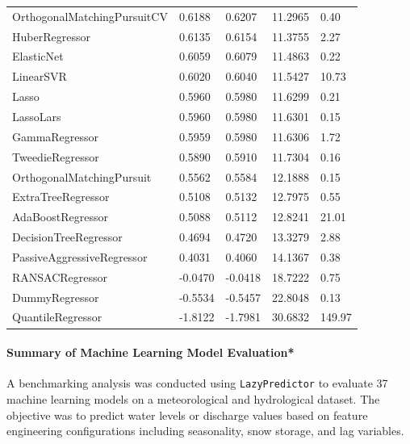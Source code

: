\documentclass[a4paper,12pt]{article}
\begin{document}
\begin{table}[H]
\begin{tabular}{lllll}
        OrthogonalMatchingPursuitCV & 0.6188 & 0.6207 & 11.2965 & 0.40 \\
        HuberRegressor & 0.6135 & 0.6154 & 11.3755 & 2.27 \\
        ElasticNet & 0.6059 & 0.6079 & 11.4863 & 0.22 \\
        LinearSVR & 0.6020 & 0.6040 & 11.5427 & 10.73 \\
        Lasso & 0.5960 & 0.5980 & 11.6299 & 0.21 \\
        LassoLars & 0.5960 & 0.5980 & 11.6301 & 0.15 \\
        GammaRegressor & 0.5959 & 0.5980 & 11.6306 & 1.72 \\
        TweedieRegressor & 0.5890 & 0.5910 & 11.7304 & 0.16 \\
        OrthogonalMatchingPursuit & 0.5562 & 0.5584 & 12.1888 & 0.15 \\
        ExtraTreeRegressor & 0.5108 & 0.5132 & 12.7975 & 0.55 \\
        AdaBoostRegressor & 0.5088 & 0.5112 & 12.8241 & 21.01 \\
        DecisionTreeRegressor & 0.4694 & 0.4720 & 13.3279 & 2.88 \\
        PassiveAggressiveRegressor & 0.4031 & 0.4060 & 14.1367 & 0.38 \\
        RANSACRegressor & -0.0470 & -0.0418 & 18.7222 & 0.75 \\
        DummyRegressor & -0.5534 & -0.5457 & 22.8048 & 0.13 \\
        QuantileRegressor & -1.8122 & -1.7981 & 30.6832 & 149.97 \\
        \bottomrule
    \end{tabular}
\end{table}

\paragraph{Summary of Machine Learning Model Evaluation*}
\label{sec:ml_summary}
A benchmarking analysis was conducted using \texttt{LazyPredictor} to evaluate 37 machine learning models on a meteorological and hydrological dataset. The objective was to predict water levels or discharge values based on feature engineering configurations including seasonality, snow storage, and lag variables.
\end{document}
